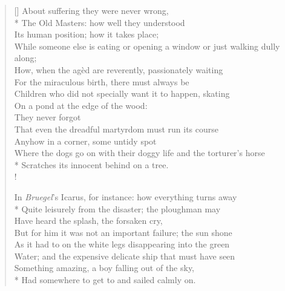\documentclass[MAIN]{subfiles}
\begin{document}
\settowidth{\versewidth}{That even the dreadful martyrdom must run its course}
\begin{verse}[\versewidth]
About suffering they were never wrong,\\*
The Old Masters: how well they understood\\
Its human position; how it takes place;\\
While someone else is eating or opening a window or just walking dully along;\\
How, when the ag{\`e}d are reverently, passionately waiting\\
For the miraculous birth, there must always be\\
Children who did not specially want it to happen, skating\\
On a pond at the edge of the wood:\\
They never forgot\\
That even the dreadful martyrdom must run its course\\
Anyhow in a corner, some untidy spot\\
Where the dogs go on with their doggy life and the torturer's horse\\*
Scratches its innocent behind on a tree.\\!

In \emph{Bruegel}'s {\hge Icarus}, for instance: how everything turns away\\*
Quite leisurely from the disaster; the ploughman may\\
Have heard the splash, the forsaken cry,\\
But for him it was not an important failure; the sun shone\\
As it had to on the white legs disappearing into the green\\
Water; and the expensive delicate ship that must have seen\\
Something amazing, a boy falling out of the sky,\\*
Had somewhere to get to and sailed calmly on.
\end{verse}
\end{document}
